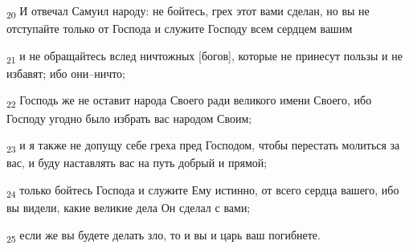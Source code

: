 \begin{tcolorbox}
\textsubscript{20} И отвечал Самуил народу: не бойтесь, грех этот вами сделан, но вы не отступайте только от Господа и служите Господу всем сердцем вашим
\end{tcolorbox}
\begin{tcolorbox}
\textsubscript{21} и не обращайтесь вслед ничтожных [богов], которые не принесут пользы и не избавят; ибо они--ничто;
\end{tcolorbox}
\begin{tcolorbox}
\textsubscript{22} Господь же не оставит народа Своего ради великого имени Своего, ибо Господу угодно было избрать вас народом Своим;
\end{tcolorbox}
\begin{tcolorbox}
\textsubscript{23} и я также не допущу себе греха пред Господом, чтобы перестать молиться за вас, и буду наставлять вас на путь добрый и прямой;
\end{tcolorbox}
\begin{tcolorbox}
\textsubscript{24} только бойтесь Господа и служите Ему истинно, от всего сердца вашего, ибо вы видели, какие великие дела Он сделал с вами;
\end{tcolorbox}
\begin{tcolorbox}
\textsubscript{25} если же вы будете делать зло, то и вы и царь ваш погибнете.
\end{tcolorbox}
